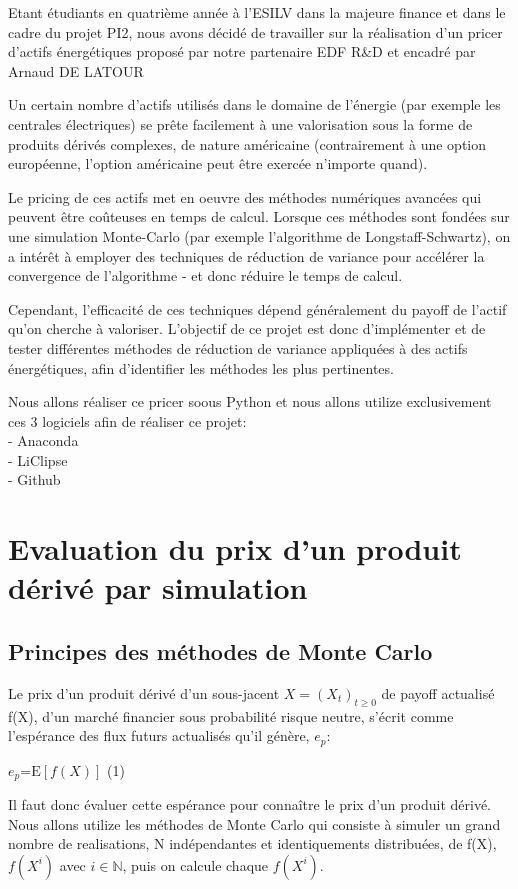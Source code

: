 \documentclass[12pt]{report}
\begin{document}
Etant étudiants en quatrième année à l’ESILV dans la majeure finance et
dans le cadre du projet PI2, nous avons décidé de travailler sur la
réalisation d’un pricer d’actifs énergétiques proposé par notre partenaire EDF R\&D et encadré par Arnaud DE LATOUR

Un certain nombre d'actifs utilisés dans le domaine de l'énergie (par exemple les
centrales électriques) se prête facilement à une valorisation sous la forme de
produits dérivés complexes, de nature américaine (contrairement à une option
européenne, l'option américaine peut être exercée n'importe quand). 

Le pricing de ces actifs met en oeuvre des méthodes numériques avancées qui
peuvent être coûteuses en temps de calcul. Lorsque ces méthodes sont fondées sur
une simulation Monte-Carlo (par exemple l'algorithme de Longstaff-Schwartz), on a
intérêt à employer des techniques de réduction de variance pour accélérer la
convergence de l'algorithme - et donc réduire le temps de calcul. 

Cependant, l'efficacité de ces techniques dépend généralement du payoff de l'actif
qu'on cherche à valoriser. L'objectif de ce projet est donc d'implémenter et de
tester différentes méthodes de réduction de variance appliquées à des actifs
énergétiques, afin d'identifier les méthodes les plus pertinentes.

Nous allons réaliser ce pricer soous Python et nous allons utilize exclusivement
ces 3 logiciels afin de réaliser ce projet:\\
- Anaconda\\
- LiClipse\\
- Github

\chapter{Evaluation du prix d'un produit dérivé par simulation}

\section{Principes des méthodes de Monte Carlo}

Le prix d'un produit dérivé d'un sous-jacent $X=(X_t)_{t\geq0}$ de payoff actualisé f(X), d'un marché financier sous probabilité risque neutre, s’écrit
comme l’espérance des flux futurs actualisés qu’il génère, $e_p$:\newline
\begin{center}
	$e_p$=$\text{E}[f(X)]$ \hspace{3cm} (1)\newline
\end{center}
Il faut donc évaluer cette espérance pour connaître le prix d’un produit dérivé.
Nous allons utilize les méthodes de Monte Carlo qui consiste à simuler un grand
nombre de realisations, N indépendantes et identiquements distribuées, de f(X),
$f(X^i)$ avec $i\in \mathbb{N}$, puis on calcule chaque $f(X^i)$.
\end{document}
